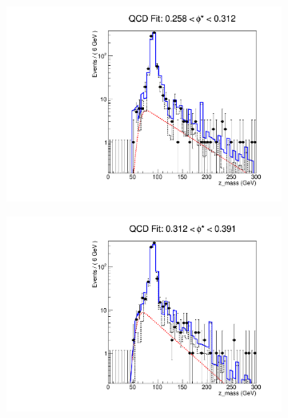 \begin{figure}[!htbp]
    \centering
    \begin{subfigure}[b]{0.5\textwidth}
        \includegraphics[width=\linewidth]{figures/qcd_fits/qcd_fit_plot_for_25.pdf}
        \caption{}
        \label{fig:qcd_fit_25}
    \end{subfigure}%
    \begin{subfigure}[b]{0.5\textwidth}
        \includegraphics[width=\linewidth]{figures/qcd_fits/qcd_fit_plot_for_26.pdf}
        \caption{}
        \label{fig:qcd_fit_26}
    \end{subfigure}
    \begin{subfigure}[b]{0.5\textwidth}

\end{subfigure}
\end{figure}

